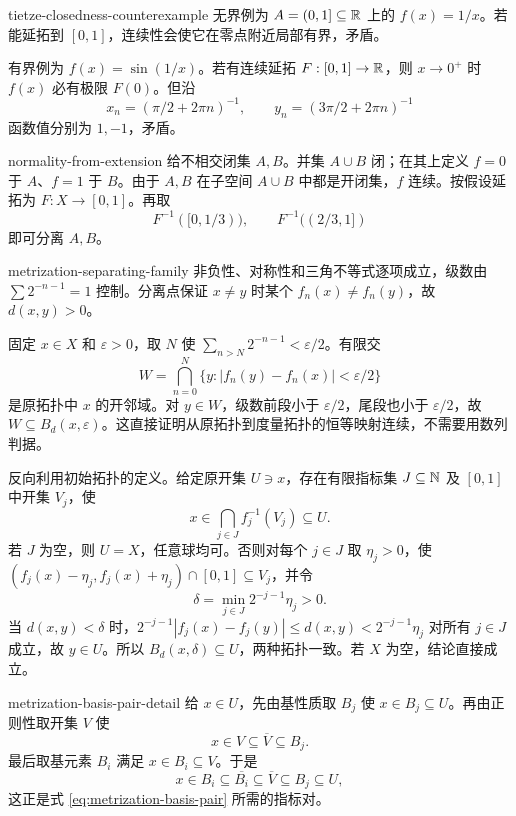 \begin{solution}{tietze-closedness-counterexample}
无界例为 \(A=(0,1]\subseteq\mathbb{R}\) 上的 \(f(x)=1/x\)。若能延拓到 \([0,1]\)，连续性会使它在零点附近局部有界，矛盾。

有界例为 \(f(x)=\sin(1/x)\)。若有连续延拓 \(F:[0,1]\to\mathbb{R}\)，则 \(x\to0^+\) 时 \(f(x)\) 必有极限 \(F(0)\)。但沿
\[
 x_n=(\pi/2+2\pi n)^{-1},\qquad
 y_n=(3\pi/2+2\pi n)^{-1}
\]
函数值分别为 \(1,-1\)，矛盾。
\end{solution}

\begin{solution}{normality-from-extension}
给不相交闭集 \(A,B\)。并集 \(A\cup B\) 闭；在其上定义 \(f=0\) 于 \(A\)、\(f=1\) 于 \(B\)。由于 \(A,B\) 在子空间 \(A\cup B\) 中都是开闭集，\(f\) 连续。按假设延拓为 \(F:X\to[0,1]\)。再取
\[
 F^{-1}([0,1/3)),\qquad F^{-1}((2/3,1])
\]
即可分离 \(A,B\)。
\end{solution}

\begin{solution}{metrization-separating-family}
非负性、对称性和三角不等式逐项成立，级数由 \(\sum2^{-n-1}=1\) 控制。分离点保证 \(x\ne y\) 时某个 \(f_n(x)\ne f_n(y)\)，故 \(d(x,y)>0\)。

固定 \(x\in X\) 和 \(\varepsilon>0\)，取 \(N\) 使
\(\sum_{n>N}2^{-n-1}<\varepsilon/2\)。有限交
\[
 W=\bigcap_{n=0}^{N}\{y:|f_n(y)-f_n(x)|<\varepsilon/2\}
\]
是原拓扑中 \(x\) 的开邻域。对 \(y\in W\)，级数前段小于 \(\varepsilon/2\)，尾段也小于 \(\varepsilon/2\)，故 \(W\subseteq B_d(x,\varepsilon)\)。这直接证明从原拓扑到度量拓扑的恒等映射连续，不需要用数列判据。

反向利用初始拓扑的定义。给定原开集 \(U\ni x\)，存在有限指标集 \(J\subseteq\mathbb{N}\) 及 \([0,1]\) 中开集 \(V_j\)，使
\[
 x\in\bigcap_{j\in J}f_j^{-1}(V_j)\subseteq U.
\]
若 \(J\) 为空，则 \(U=X\)，任意球均可。否则对每个 \(j\in J\) 取 \(\eta_j>0\)，使 \((f_j(x)-\eta_j,f_j(x)+\eta_j)\cap[0,1]\subseteq V_j\)，并令
\[
 \delta=\min_{j\in J}2^{-j-1}\eta_j>0.
\]
当 \(d(x,y)<\delta\) 时，\(2^{-j-1}|f_j(x)-f_j(y)|\le d(x,y)<2^{-j-1}\eta_j\) 对所有 \(j\in J\) 成立，故 \(y\in U\)。所以 \(B_d(x,\delta)\subseteq U\)，两种拓扑一致。若 \(X\) 为空，结论直接成立。
\end{solution}

\begin{solution}{metrization-basis-pair-detail}
给 \(x\in U\)，先由基性质取 \(B_j\) 使 \(x\in B_j\subseteq U\)。再由正则性取开集 \(V\) 使
\[
 x\in V\subseteq\overline V\subseteq B_j.
\]
最后取基元素 \(B_i\) 满足 \(x\in B_i\subseteq V\)。于是
\[
 x\in B_i\subseteq\overline{B_i}
 \subseteq\overline V\subseteq B_j\subseteq U,
\]
这正是式 \eqref{eq:metrization-basis-pair} 所需的指标对。
\end{solution}

